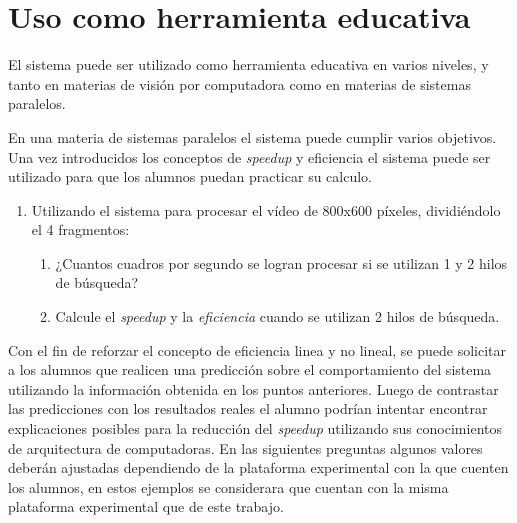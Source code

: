 
\section{Uso como herramienta educativa}

\label{usoEducativo}

El sistema puede ser utilizado como herramienta educativa en varios niveles, y
tanto en materias de visión por computadora como en materias de sistemas
paralelos.

En una materia de sistemas paralelos el sistema puede cumplir varios objetivos.
Una vez introducidos los conceptos de \emph{speedup} y eficiencia el sistema
puede ser utilizado para que los alumnos puedan practicar su calculo.

\begin{enumerate}

	\item{Utilizando el sistema para procesar el vídeo de 800x600 píxeles,
		dividiéndolo el 4 fragmentos:

\begin{enumerate}

	\item{¿Cuantos cuadros por segundo se logran procesar si se utilizan 1 y
		2 hilos de búsqueda?}

	\item{Calcule el \emph{speedup} y la \emph{eficiencia} cuando se
		utilizan 2 hilos de búsqueda.}

\end{enumerate}}

\end{enumerate}

Con el fin de reforzar el concepto de eficiencia linea y no lineal, se puede
solicitar a los alumnos que realicen una predicción sobre el comportamiento del
sistema utilizando la información obtenida en los puntos anteriores. Luego de
contrastar las predicciones con los resultados reales el alumno podrían intentar
encontrar explicaciones posibles para la reducción del \emph{speedup} utilizando
sus conocimientos de arquitectura de computadoras. En las siguientes preguntas
algunos valores deberán ajustadas dependiendo de la plataforma experimental con
la que cuenten los alumnos, en estos ejemplos se considerara que cuentan con la
misma plataforma experimental que de este trabajo.

